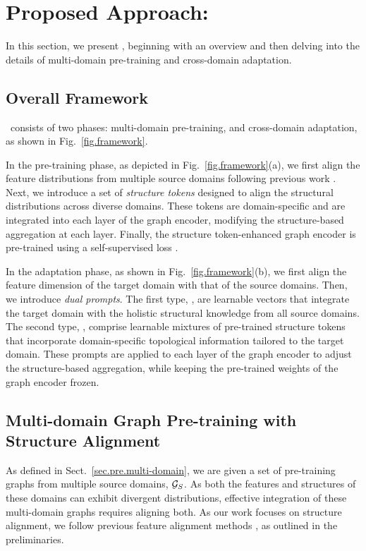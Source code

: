 \section{Proposed Approach: \model}

In this section, we present \model, beginning with an overview and then delving into the details of multi-domain pre-training and cross-domain adaptation.

\subsection{Overall Framework}
\model\ consists of two phases: multi-domain pre-training, and cross-domain adaptation, as shown in Fig.~\ref{fig.framework}.

In the pre-training phase, as depicted in Fig.~\ref{fig.framework}(a), we first align the feature distributions from multiple source domains following previous work \cite{zhao2024all,yu2024text}. 
Next, we introduce a set of \textit{structure tokens} designed to align the structural distributions across diverse domains. These tokens are domain-specific and are integrated into each layer of the graph encoder, modifying the structure-based aggregation at each layer. 
Finally, the structure token-enhanced graph encoder is pre-trained using a self-supervised loss  \cite{liu2023graphprompt}.

In the adaptation phase, as shown in Fig.~\ref{fig.framework}(b), we first align the feature dimension of the target domain with that of the source domains. Then, we introduce \textit{dual prompts}. The first type, \emph{\op}, are learnable vectors that integrate the target domain with the holistic structural knowledge from all source domains. The second type, \emph{\cp}, comprise learnable mixtures of pre-trained structure tokens that incorporate domain-specific topological information tailored to the target domain. These prompts are applied to each layer of the graph encoder to adjust the structure-based aggregation, while keeping the pre-trained weights of the graph encoder frozen. 

\subsection{Multi-domain Graph Pre-training with Structure Alignment}

As defined in Sect.~\ref{sec.pre.multi-domain}, we are given a set of pre-training graphs from multiple source domains, $\mathcal{G}_S$. As both the features and structures of these domains can exhibit divergent distributions, effective integration of these multi-domain graphs requires aligning both.
As our work focuses on structure alignment, we follow previous feature alignment methods  \cite{zhao2024all,yu2024text}, as outlined in the preliminaries.  





